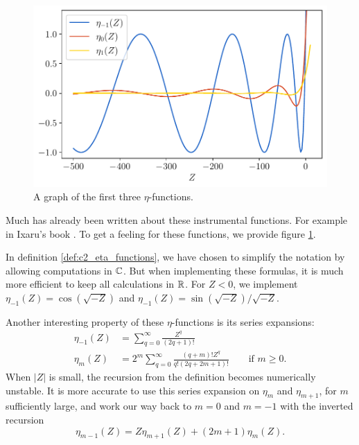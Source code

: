 \begin{figure}
    \begin{center}
        \includegraphics[width=\textwidth]{img/chapter2/eta_functions.pdf}
    \end{center}
    \caption{A graph of the first three $\eta$-functions.}\label{fig:c2_eta_functions}
\end{figure}

Much has already been written about these instrumental functions. For example in Ixaru's book \cite{ixaru_numerical_1984}. To get a feeling for these functions, we provide figure \ref{fig:c2_eta_functions}.

In definition \ref{def:c2_eta_functions}, we have chosen to simplify the notation by allowing computations in $\mathbb{C}$. But when implementing these formulas, it is much more efficient to keep all calculations in $\mathbb{R}$. For $Z < 0$, we implement $\eta_{-1}(Z) = \cos(\sqrt{-Z})$ and $\eta_{-1}(Z) = \sin(\sqrt{-Z})/\sqrt{-Z}$.

Another interesting property of these $\eta$-functions is its series expansions:\begin{align*}
    \eta_{-1}(Z) & = \sum_{q=0}^{\infty} \frac{Z^q}{(2q + 1)!}                                                      \\
    \eta_{m}(Z)  & = 2^m \sum_{q=0}^{\infty} \frac{(q+m)! Z^q}{q!(2q + 2m + 1)!} \qquad \text{if } m \geq 0\text{.}
\end{align*}
When $|Z|$ is small, the recursion from the definition becomes numerically unstable. It is more accurate to use this series expansion on $\eta_m$ and $\eta_{m+1}$, for $m$ sufficiently large, and work our way back to $m=0$ and $m=-1$ with the inverted recursion
$$
    \eta_{m-1}(Z) = Z \eta_{m+1}(Z) + (2 m + 1) \eta_{m}(Z)
    \text{.}
$$

